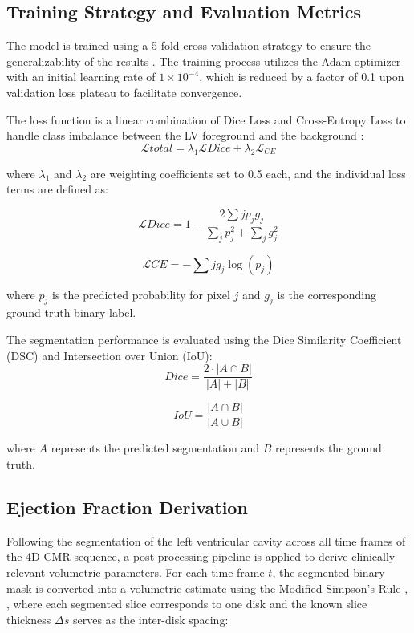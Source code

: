 \documentclass[final,3p,times,twocolumn]{elsarticle}
\begin{document}
\subsection{Training Strategy and Evaluation Metrics}
The model is trained using a 5-fold cross-validation strategy to ensure the generalizability of the results \cite{b2}. The training process utilizes the Adam optimizer \cite{b8} with an initial learning rate of $1 \times 10^{-4}$, which is reduced by a factor of 0.1 upon validation loss plateau to facilitate convergence.

The loss function is a linear combination of Dice Loss and Cross-Entropy Loss to handle class imbalance between the LV foreground and the background \cite{b17}:
\begin{equation}
\mathcal{L}{total} = \lambda_1 \mathcal{L}{Dice} +
\lambda_2 \mathcal{L}_{CE}
\label{eq:loss}
\end{equation}

\noindent where $\lambda_1$ and $\lambda_2$ are weighting coefficients set to 0.5 each, and the individual loss terms are defined as:

\begin{equation}
\mathcal{L}{Dice} = 1 - \frac{2\sum{j} p_j g_j}
{\sum_{j} p_j^2 + \sum_{j} g_j^2}
\label{eq:dice_loss}
\end{equation}

\begin{equation}
\mathcal{L}{CE} = -\sum{j} g_j \log(p_j)
\label{eq:ce_loss}
\end{equation}

\noindent where $p_j$ is the predicted probability for pixel $j$ and $g_j$ is the corresponding ground truth binary label.

The segmentation performance is evaluated using the Dice Similarity Coefficient (DSC) and Intersection over Union (IoU):
\begin{equation}
Dice = \frac{2 \cdot |A \cap B|}{|A| + |B|}
\label{eq:dice}
\end{equation}

\begin{equation}
IoU = \frac{|A \cap B|}{|A \cup B|}
\label{eq:iou}
\end{equation}

\noindent where $A$ represents the predicted segmentation and $B$ represents the ground truth.

\subsection{Ejection Fraction Derivation}
Following the segmentation of the left ventricular cavity across all time frames of the 4D CMR sequence, a post-processing pipeline is applied to derive clinically relevant volumetric parameters. For each time frame $t$, the segmented binary mask is converted into a volumetric estimate using the Modified Simpson's Rule \cite{b27}, \cite{b28}, where each segmented slice corresponds to one disk and the known slice thickness $\Delta s$ serves as the inter-disk spacing:
\end{document}

